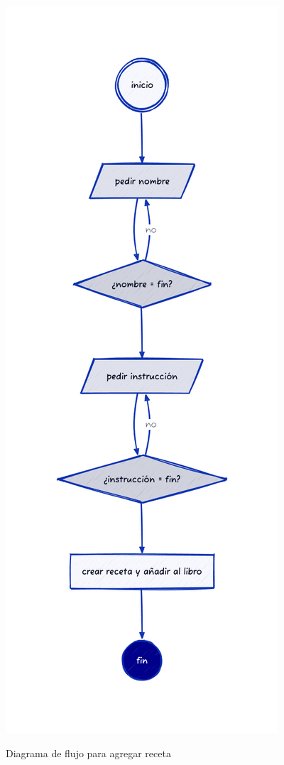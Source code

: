 \documentclass[
    a4paper, %
    12pt, %
]{CSSullivanBusinessReport}
\begin{document}
\begin{marginfigure}
	\includegraphics[width=\linewidth]{Images/agregar-receta.png}
	\caption{Diagrama de flujo para agregar receta}\label{fig:agregar-receta}
\end{marginfigure}

\end{document}
